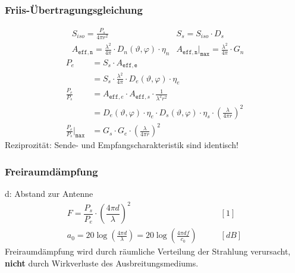 \subsubsection{Friis-Übertragungsgleichung}
\begin{align*}
	&S_{iso} = \frac{P_s}{4\pi r^2} & S_s = S_{iso} \cdot D_s\\
	&A_{\mathtt{eff,n}} = \frac{\lambda^2}{4\pi}\cdot D_n(\vartheta, \varphi)\cdot \eta_n & A_{\mathtt{eff,n}}\Big|_{\mathtt{max}} = \frac{\lambda^2}{4\pi}\cdot G_n
\end{align*}
\begin{align*}
	P_e & = S_s \cdot A_{\mathtt{eff,e}}\\
	 &=  S_s\cdot \frac{\lambda^2}{4\pi}\cdot D_e(\vartheta, \varphi)\cdot \eta_e\\
    \frac{P_{e}}{P_{s}}          & = A_{\texttt{eff},e}\cdot A_{\texttt{eff},s}\cdot\frac{1}{\lambda^2r^2}                          \\
       & = D_e(\vartheta, \varphi)\cdot\eta_{e}\cdot D_s(\vartheta, \varphi)\cdot\eta_{s}\cdot\left(\frac{\lambda}{4\pi r}\right)^2\\
       \frac{P_{e}}{P_{s}}\Big|_{\mathtt{max}} & = G_{s}\cdot G_{e}\cdot \left(\frac{\lambda}{4\pi r}\right)^2
\end{align*}
Reziprozität: Sende- und Empfangscharakteristik sind identisch! 
\subsubsection{Freiraumdämpfung}
d: Abstand zur Antenne
\begin{align*}
    F = \dfrac{P_{s}}{P_{e}} \cdot \left(\dfrac{4 \pi d}{\lambda}\right)^2                         & \qquad [1]       \\
    a_{0} = 20 \log \left(\frac{4 \pi d}{\lambda}\right) =20 \log \left(\frac{4 \pi d f}{c_{0}}\right) & \qquad [\si{dB}]
\end{align*}
Freiraumdämpfung wird durch räumliche Verteilung der Strahlung verursacht, \textbf{nicht} durch Wirkverluste des Ausbreitungsmediums.
